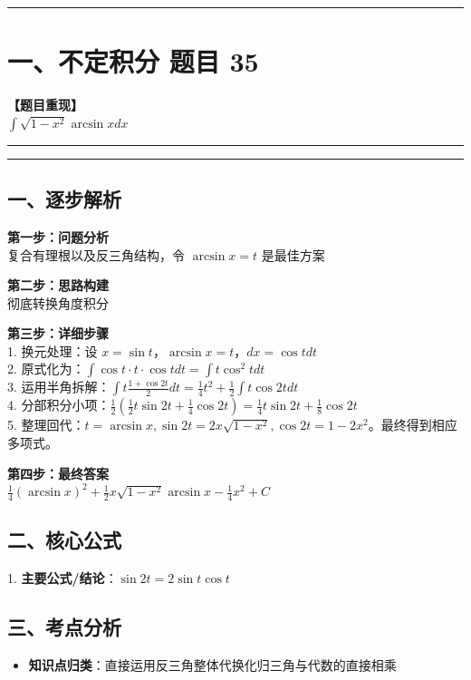 ﻿\documentclass[12pt, a4paper]{ctexart}
\newcommand{\TopSeparator}{
    \par\noindent\rule{\textwidth}{1.5pt}\vspace{0.5em}
}
\newcommand{\AnalysisSeparator}{
    \par\noindent\rule{\textwidth}{0.5pt}\vspace{0.2em}\hrule\vspace{0.5em}
}
\newenvironment{RedAnalysis}{
    \par
    \color{red} 
}{
    \par
    \color{black} 
}
\begin{document}
\vspace{2em}

\TopSeparator
\section*{一、不定积分 题目 35}

\textbf{【题目重现】} \\
$\int \sqrt{1-x^2} \arcsin x dx$

\AnalysisSeparator

\begin{RedAnalysis}

	\subsection*{一、逐步解析}

	\textbf{第一步：问题分析} \\
	复合有理根以及反三角结构，令 $ \arcsin x = t$ 是最佳方案

	\textbf{第二步：思路构建} \\
	彻底转换角度积分

	\textbf{第三步：详细步骤} \\
	1. 换元处理：设 $x = \sin t$，$\arcsin x = t$，$dx = \cos t dt$ \\ 
	2. 原式化为：$\int \cos t \cdot t \cdot \cos t dt = \int t \cos^2 t dt$ \\ 
	3. 运用半角拆解：$\int t \frac{1+\cos 2t}{2} dt = \frac{1}{4}t^2 + \frac{1}{2} \int t \cos 2t dt$ \\ 
	4. 分部积分小项：$\frac{1}{2}( \frac{1}{2}t\sin 2t + \frac{1}{4}\cos 2t ) = \frac{1}{4}t\sin 2t + \frac{1}{8}\cos 2t$ \\ 
	5. 整理回代：$t=\arcsin x, \sin 2t=2x\sqrt{1-x^2}, \cos 2t=1-2x^2$。最终得到相应多项式。

	\textbf{第四步：最终答案} \\
	$\frac{1}{4}(\arcsin x)^2 + \frac{1}{2}x\sqrt{1-x^2}\arcsin x - \frac{1}{4}x^2 + C$

	\subsection*{二、核心公式}
	1. \textbf{主要公式/结论}：$\sin 2t = 2\sin t\cos t$

	\subsection*{三、考点分析}
	\begin{itemize}
		\item \textbf{知识点归类}：直接运用反三角整体代换化归三角与代数的直接相乘
	\end{itemize}

\end{RedAnalysis}
\end{document}
